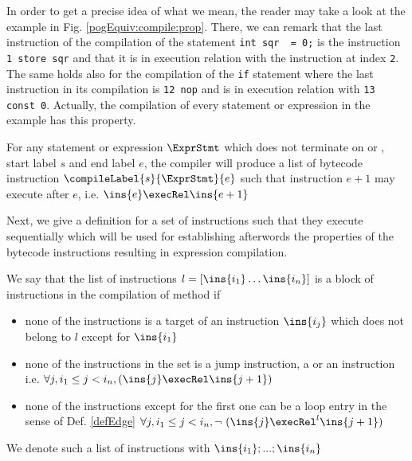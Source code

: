 In order to get a precise idea of what we mean, the reader may take a look at the example in Fig. \ref{pogEquiv:compile:prop}.
There, we can remark that the last instruction of the compilation of the statement \lstinline!int sqr  = 0;! is the instruction \lstinline!1 store sqr! 
and that it is in execution relation with the instruction at index \lstinline!2!. The same holds also for the compilation of the \lstinline!if!
statement where the last instruction  in its compilation is \lstinline!12 nop! and is  in execution relation with \lstinline!13 const 0!.
Actually, the compilation of every statement or expression in the example has this property.

\begin{compProp}\label{compile:prop:compProp0}
 For any statement or expression $\ExprStmt$ which does not terminate on \return or \athrow, start label $s$ and end label $e$,
    the compiler will produce a list of bytecode instruction $\compileLabel{s}{\ExprStmt}{e}$ such that  instruction  $e+1$ may execute after
    $e$, i.e.   $ \ins{e} \execRel \ins{e+1}$
\end{compProp}





 


Next, we give a definition for a set of instructions such that they execute sequentially which will be used for 
establishing afterwords the properties of the bytecode instructions resulting in expression compilation.
 
\begin{seqInstr} \label{seqInstr}
We say that the list of instructions  $l  = \lbrack \ins{i_1} \ldots \ins{i_n} \rbrack$ is a block of instructions
 in the compilation of method \methodd{} if 
 \begin{itemize}
      \item none of the instructions is a target of an instruction $\ins{i_j}$ which does not belong to $l$ except for $\ins{i_1}$
      \item none of the instructions in the set is a jump instruction, a \return{} or an \athrow{} instruction
            i.e. %
                $  \forall j, i_1 \le  j < i_n ,   ( \ins{j} \execRel \ins{j + 1} ) $ 
      \item none of the instructions except for the first one can be a loop entry in the sense of Def. \ref{defEdge}
             $  \forall j, i_1 \le  j < i_n , \neg  \ ( \ins{j} \execRel^{l} \ins{j + 1} ) $ 
 \end{itemize}

We denote such a list of instructions with $\ins{i_1};...;\ins{i_n}$

\end{seqInstr}


